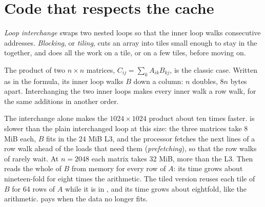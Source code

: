\section{Code that respects the cache}\label{sec:b2:caches:code}

\begin{definition}\label{def:b2:caches:blocking}
\emph{Loop interchange} swaps two nested loops so that the inner loop walks consecutive
addresses. \emph{Blocking}, or \emph{tiling}, cuts an array into tiles small enough to
stay in the  together, and does all the work on a tile, or on a few tiles, before moving on.
\end{definition}

The product of two $n \times n$ matrices, $C_{ij} = \sum_k A_{ik} B_{kj}$, is the classic case. Written as in the
formula, its inner loop walks $B$ down a column: $n$ doubles, $8n$ bytes apart. Interchanging the two inner loops
makes every inner walk a row walk, for the same additions in another order.


\label{lst:b2:caches:blocked}

\label{out:b2:caches:matmul}

The interchange alone makes the $1024 \times 1024$ product about ten times faster.  is slower than the plain
interchanged loop at this size: the three matrices take 8 MiB each, $B$ fits in the 24 MiB L3, and the processor
fetches the next lines of a row walk ahead of the loads that need them (\emph{prefetching}), so that the row walks
of  rarely wait. At $n = 2048$ each matrix takes 32 MiB, more than the L3. Then  reads the whole
of $B$ from memory for every row of $A$: its time grows about nineteen-fold for eight times the arithmetic. The tiled
version reuses each tile of $B$ for 64 rows of $A$ while it is in , and its time grows about eightfold, like the
arithmetic.  pays when the data no longer fits.

